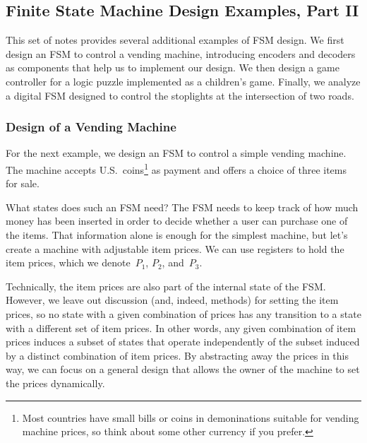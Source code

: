 \classtitle

\subsection{Finite State Machine Design Examples, Part II}

This set of notes provides several additional examples of FSM design.
We first design an FSM to control a vending machine, introducing
encoders and decoders as components that help us to implement our
design.  We then design a game controller for a logic puzzle
implemented as a children's game.  Finally, we analyze a digital FSM
designed to control the stoplights at the intersection of two roads.\\


\subsubsection{Design of a Vending Machine}

For the next example, we design an FSM to control a simple vending machine.  
The machine accepts \mbox{U.S.~coins}\footnote{Most countries have small 
bills or coins in demoninations suitable for vending machine prices, so think 
about some other currency if you prefer.} as payment and offers a choice
of three items for sale.

What states does such an FSM need?  The FSM needs to keep track of how
much money has been inserted in order to decide whether a user can 
purchase one of the items.  That information alone is enough for the
simplest machine, but let's create a machine with adjustable item
prices.  We can use registers to hold the item prices, which 
we denote~$P_1$, $P_2$, and~$P_3$.

Technically, the item prices are also part of the internal state of the 
FSM.  However,  we leave out discussion (and, indeed, methods) for setting
the item prices, so no state with a given combination of prices has any 
transition to a state with a different set of item prices.
In other words, any given combination of item prices induces a subset 
of states that operate independently of the subset induced by a distinct 
combination of item prices.  By abstracting away the prices in this way,
we can focus on a general design that allows the owner of the machine
to set the prices dynamically.

